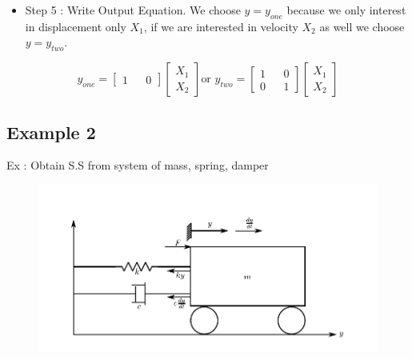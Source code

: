 \documentclass[12pt,a4paper]{article}
\begin{document}
	\begin{itemize}
		\item Step 5 : Write Output Equation. We choose \(y=y_{one}\) because we only interest in displacement only \(X_1\), if we are interested in velocity \(X_2\) as well we choose \(y=y_{two}\).
	\end{itemize}
	\[
	y_{one} =
	\begin{bmatrix}
		1 &   & 0 
	\end{bmatrix}
	\begin{bmatrix}
		X_1 \\
		X_2 
	\end{bmatrix} \text{or  }
	y_{two} = 
	\begin{bmatrix}
		1 &   & 0 \\
		0 &   & 1 
	\end{bmatrix}
	\begin{bmatrix}
		X_1 \\
		X_2 
	\end{bmatrix}
	\]
	
	
	
	\subsection{Example 2}
	Ex : Obtain S.S from system of mass, spring, damper
	
	\begin{figure}[ht]
		\centering
		\includegraphics[scale=1]{src/img1.pdf}
	\end{figure}
\end{document}
